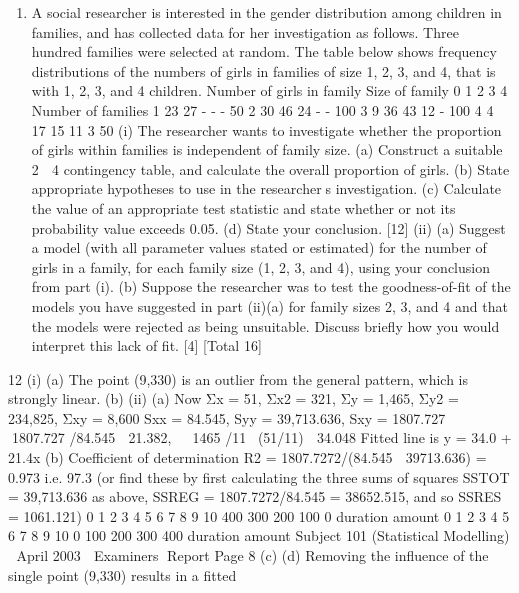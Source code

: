 \documentclass[a4paper,12pt]{article}
\begin{document}
\begin{enumerate}
(iii) Suppose that the sample values are:
32 48 51 43 82 155
Obtain the approximate maximum likelihood estimates for  and m given
in (ii). [2]
\item A social researcher is interested in the gender distribution among children in families,
and has collected data for her investigation as follows.
Three hundred families were selected at random. The table below shows frequency
distributions of the numbers of girls in families of size 1, 2, 3, and 4, that is with 1, 2,
3, and 4 children.
Number of girls in family
Size of
family 0 1 2 3 4
Number of
families
1 23 27 - - - 50
2 30 46 24 - - 100
3 9 36 43 12 - 100
4 4 17 15 11 3 50
(i) The researcher wants to investigate whether the proportion of girls within
families is independent of family size.
(a) Construct a suitable 2  4 contingency table, and calculate the overall
proportion of girls.
(b) State appropriate hypotheses to use in the researchers investigation.
(c) Calculate the value of an appropriate test statistic and state whether or
not its probability value exceeds 0.05.
(d) State your conclusion. [12]
(ii) (a) Suggest a model (with all parameter values stated or estimated) for the
number of girls in a family, for each family size (1, 2, 3, and 4), using
your conclusion from part (i).
(b) Suppose the researcher was to test the goodness-of-fit of the models
you have suggested in part (ii)(a) for family sizes 2, 3, and 4 and that
the models were rejected as being unsuitable. Discuss briefly how you
would interpret this lack of fit. [4]
[Total 16]
\end{enumerate}
\newpage
12 (i) (a)
The point (9,330) is an outlier from the general pattern, which is
strongly linear.
(b)
(ii) (a) Now Σx = 51, Σx2 = 321, Σy = 1,465, Σy2 = 234,825, Σxy = 8,600
Sxx = 84.545, Syy = 39,713.636, Sxy = 1807.727
  1807.727 /84.545  21.382,  1465 /11(51/11)  34.048
Fitted line is y = 34.0 + 21.4x
(b) Coefficient of determination R2 = 1807.7272/(84.545  39713.636)
= 0.973 i.e. 97.3%
(or find these by first calculating the three sums of squares SSTOT
= 39,713.636 as above, SSREG = 1807.7272/84.545 = 38652.515, and
so SSRES = 1061.121)
0 1 2 3 4 5 6 7 8 9 10
400
300
200
100
0
duration
amount
0 1 2 3 4 5 6 7 8 9 10
0
100
200
300
400
duration
amount
Subject 101 (Statistical Modelling)  April 2003  Examiners Report
Page 8
(c)
(d) Removing the influence of the single point (9,330) results in a fitted
\end{document}
